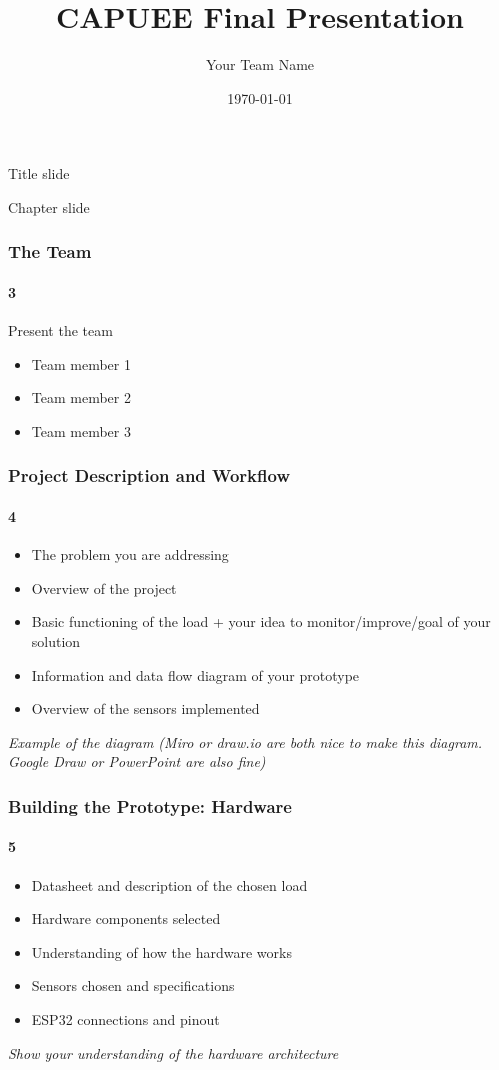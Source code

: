 \documentclass{beamer}
\title{CAPUEE Final Presentation}
\author{Your Team Name}
\date{\today}
\begin{document}
\begin{frame}
  \titlepage
  \vspace*{2cm}
  \centering
  \large Title slide
\end{frame}

\begin{frame}
  \centering
  \vspace*{3cm}
  \Huge Chapter slide
  \vspace*{3cm}
\end{frame}

\begin{frame}
  \frametitle{The Team}
  \framesubtitle{3}
  
  Present the team
  
  \vspace*{2cm}
  \begin{itemize}
    \item Team member 1
    \item Team member 2
    \item Team member 3
  \end{itemize}
\end{frame}

\begin{frame}
  \frametitle{Project Description and Workflow}
  \framesubtitle{4}
  
  \begin{itemize}
    \item The problem you are addressing
    \item Overview of the project
    \item Basic functioning of the load + your idea to monitor/improve/goal of your solution
    \item Information and data flow diagram of your prototype
    \item Overview of the sensors implemented
  \end{itemize}
  
  \vspace*{1cm}
  \textit{Example of the diagram (Miro or draw.io are both nice to make this diagram. Google Draw or PowerPoint are also fine)}
\end{frame}

\begin{frame}
  \frametitle{Building the Prototype: Hardware}
  \framesubtitle{5}
  
  \begin{itemize}
    \item Datasheet and description of the chosen load
    \item Hardware components selected
    \item Understanding of how the hardware works
    \item Sensors chosen and specifications
    \item ESP32 connections and pinout
  \end{itemize}
  
  \vspace*{1.5cm}
  \textit{Show your understanding of the hardware architecture}
\end{frame}
\end{document}
